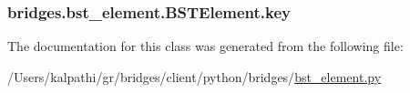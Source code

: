 \subsubsection[{key}]{\setlength{\rightskip}{0pt plus 5cm}bridges.\+bst\+\_\+element.\+B\+S\+T\+Element.\+key}\label{classbridges_1_1bst__element_1_1_b_s_t_element_a8b4c0d8d6a2a7e0fefb013038d26f146}


The documentation for this class was generated from the following file\+:\begin{DoxyCompactItemize}
\item 
/\+Users/kalpathi/gr/bridges/client/python/bridges/\hyperlink{bst__element_8py}{bst\+\_\+element.\+py}\end{DoxyCompactItemize}
